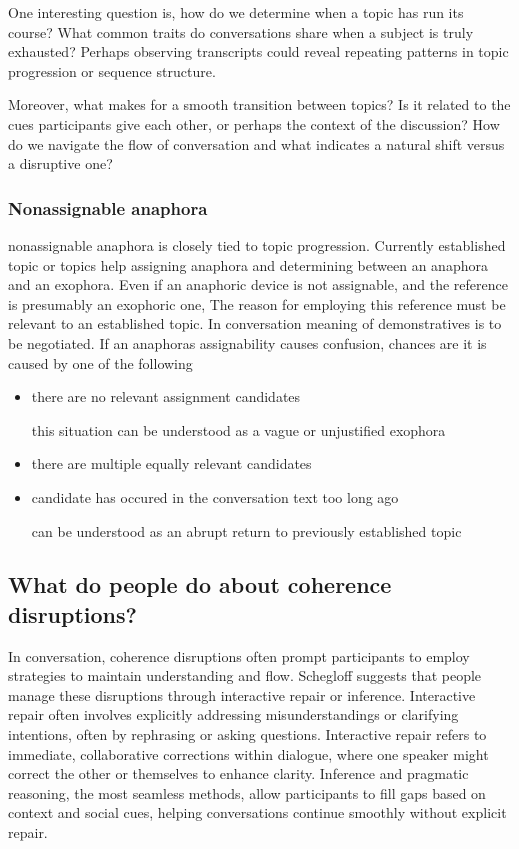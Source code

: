 \documentclass[12pt]{report}
\begin{document}
{\par
    One interesting question is,
    how do we determine when a topic has run its course?
    What common traits do conversations share when a subject is truly exhausted?
    Perhaps observing transcripts could reveal repeating patterns in topic progression or sequence structure.

\par
    Moreover, what makes for a smooth transition between topics?
    Is it related to the cues participants give each other,
    or perhaps the context of the discussion?
    How do we navigate the flow of conversation and
    what indicates a natural shift versus a disruptive one?

\subsubsection{Nonassignable anaphora}
\par
    nonassignable anaphora is closely tied to topic progression.
    Currently established topic or topics help assigning anaphora and
    determining between an anaphora and an exophora.
    Even if an anaphoric device is not assignable,
    and the reference is presumably an exophoric one,
    The reason for employing this reference must be
    relevant to an established topic.
    In conversation meaning of demonstratives is to be negotiated.
    If an anaphoras assignability causes confusion,
    chances are it is caused by one of the following

\begin{itemize}
\item
there are no relevant assignment candidates

    \quad
    this situation can be understood as a vague or unjustified exophora

\item
there are multiple equally relevant candidates

\item
candidate has occured in the conversation text too long ago

    \quad
    can be understood as an abrupt return to previously established topic
\end{itemize}

\subsection{What do people do about coherence disruptions?}
\par
In conversation, coherence disruptions often prompt participants to
employ strategies to maintain understanding and flow.
Schegloff suggests that people manage these disruptions through interactive repair or inference.
Interactive repair often involves
explicitly addressing misunderstandings or clarifying intentions,
often by rephrasing or asking questions.
Interactive repair refers to immediate, collaborative corrections within dialogue,
where one speaker might correct the other or themselves to enhance clarity.
Inference and pragmatic reasoning, the most seamless methods,
allow participants to fill gaps based on context and social cues,
helping conversations continue smoothly without explicit repair.

}
\end{document}
